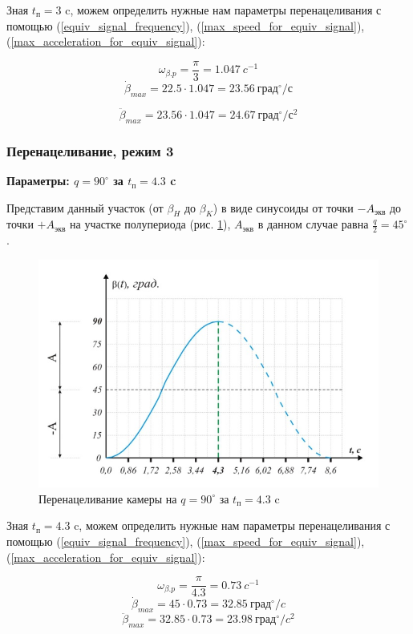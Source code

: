 Зная $t_{\text{п} } = 3$ c, можем определить нужные нам параметры перенацеливания
с помощью (\ref{equiv_signal_frequency}),
(\ref{max_speed_for_equiv_signal}),
(\ref{max_acceleration_for_equiv_signal}):

$$
    \omega_{\beta.p} = \frac{\pi}{3} = 1.047 ~c^{-1}
$$
$$
    \dot{\beta}_{max} = 22.5 \cdot 1.047 = 23.56 ~\text{град}^{\circ} / \text{с}
$$

$$
    \ddot{\beta}_{max} = 23.56 \cdot 1.047 = 24.67 ~\text{град}^{\circ} / \text{с}^{2}
$$

\subsubsection{Перенацеливание, режим 3}

\textbf{Параметры: $q = 90^{\circ}$ за $t_\text{п} = 4.3$ c}

Представим данный участок (от $\beta_{H}$ до $\beta_{K}$) в виде синусоиды от точки
$-A_\text{экв}$ до точки $+A_\text{экв}$ на участке полупериода
(рис. \ref{retarget_90grad_4,3sec}), $A_\text{экв}$ в данном случае
равна $\frac{q}{2} = 45^{\circ}$.

\begin{figure}[ht!]
    \centering
    \includegraphics[keepaspectratio]{./src/pictures/retarget_equivalent_input_signals/90grad_4,3sec}
    \caption{Перенацеливание камеры на $q = 90^{\circ}$ за $t_\text{п} = 4.3$ c}
    \label{retarget_90grad_4,3sec}
\end{figure}

Зная $t_{\text{п} } = 4.3$ c, можем определить нужные нам параметры перенацеливания
с помощью (\ref{equiv_signal_frequency}),
(\ref{max_speed_for_equiv_signal}),
(\ref{max_acceleration_for_equiv_signal}):

$$
    \omega_{\beta.p} = \frac{\pi}{4.3} = 0.73 ~c^{-1}
$$
$$
    \dot{\beta}_{max} = 45 \cdot 0.73 = 32.85 ~\text{град}^{\circ} / c
$$
$$
    \ddot{\beta}_{max} = 32.85 \cdot 0.73 = 23.98 ~\text{град}^{\circ} / c^{2}
$$

\endinput


